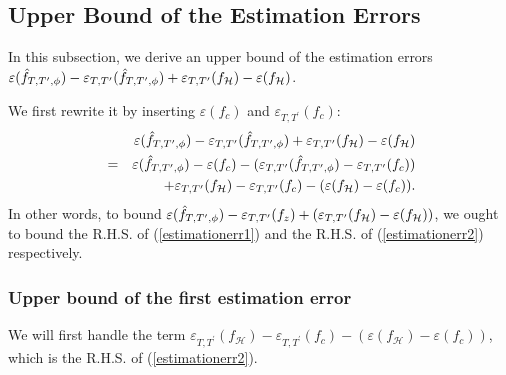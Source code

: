 \documentclass{article}
\begin{document}
\subsection{Upper Bound of the Estimation Errors}\label{subsec:estimation}
In this subsection, we derive an upper bound of the estimation errors  $\varepsilon(\Hat{f}_{T, T^\prime,\phi})- \varepsilon_{T,T^\prime}(\Hat{f}_{T, T^\prime,\phi}) + \varepsilon_{T,T^\prime}(f_\mathcal{H}) - \varepsilon(f_\mathcal{H})$. 

We first rewrite it by inserting $\varepsilon(f_c)$ and $\varepsilon_{T,T^\prime}(f_c)$:
\begin{eqnarray} 
&& \varepsilon(\Hat{f}_{T, T^\prime,\phi}) -\varepsilon_{T,T^\prime}(\Hat{f}_{T, T^\prime,\phi}) + \varepsilon_{T,T^\prime}(f_\mathcal{H}) - \varepsilon(f_\mathcal{H}) \nonumber\\
 &=&   \varepsilon(\Hat{f}_{T, T^\prime,\phi}) -\varepsilon(f_c)- (\varepsilon_{T,T^\prime}(\Hat{f}_{T, T^\prime,\phi})-\varepsilon_{T,T^\prime}(f_c)) \label{estimationerr1} \\
 &&+ \varepsilon_{T,T^\prime}(f_\mathcal{H}) - \varepsilon_{T,T^\prime}(f_c) - (\varepsilon(f_\mathcal{H})- \varepsilon(f_c)).   \label{estimationerr2}    
\end{eqnarray}
In other words, to bound $\varepsilon(\Hat{f}_{T, T^\prime,\phi})- \varepsilon_{T,T^\prime}(f_z) + (\varepsilon_{T,T^\prime}(f_\mathcal{H}) - \varepsilon(f_\mathcal{H}))$, we ought to  bound the R.H.S. of (\ref{estimationerr1}) and the R.H.S. of (\ref{estimationerr2}) respectively. 

\subsubsection{Upper bound of the first estimation error}
We will first handle the term $\varepsilon_{T, T^\prime}(f_\mathcal{H}) - \varepsilon_{T, T^\prime}(f_c) - (\varepsilon(f_\mathcal{H})- \varepsilon(f_c))$, which is the R.H.S. of (\ref{estimationerr2}).  
\end{document}
